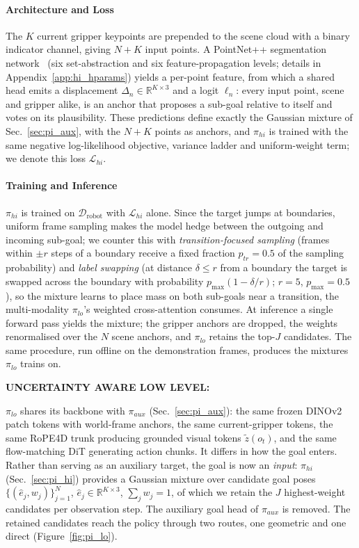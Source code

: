\documentclass[letterpaper, 10 pt, conference]{ieeeconf}  %
\begin{document}
\paragraph{\textbf{Architecture and Loss}}
The $K$ current gripper keypoints are prepended to the scene cloud with a
binary indicator channel, giving $N{+}K$ input points. A PointNet++
segmentation network~\cite{pointnet++} (six set-abstraction and six
feature-propagation levels; details in Appendix~\ref{app:hi_hparams}) yields a
per-point feature, from which a shared head emits a displacement
$\Delta_n\in\mathbb{R}^{K\times 3}$ and a logit $\ell_n$: every input point,
scene and gripper alike, is an anchor that proposes a sub-goal relative to
itself and votes on its plausibility. These predictions define exactly the
Gaussian mixture of Sec.~\ref{sec:pi_aux}, with the $N{+}K$ points as anchors,
and $\pi_{hi}$ is trained with the same
negative log-likelihood objective, variance ladder and uniform-weight term;
we denote this loss $\mathcal{L}_{hi}$.

\paragraph{\textbf{Training and Inference}}
$\pi_{hi}$ is trained on $\mathcal{D}_{\text{robot}}$ with $\mathcal{L}_{hi}$
alone. Since the target jumps at boundaries, uniform frame sampling makes the
model hedge between the outgoing and incoming sub-goal; we counter this with
\emph{transition-focused sampling} (frames within $\pm r$ steps of a boundary
receive a fixed fraction $p_{tr}{=}0.5$ of the sampling probability) and
\emph{label swapping} (at distance $\delta\le r$ from a boundary the target is swapped across the
boundary with probability $p_{\max}(1-\delta/r)$; $r{=}5$, $p_{\max}{=}0.5$), so the
mixture learns to place mass on both sub-goals near a transition, the
multi-modality $\pi_{lo}$'s weighted cross-attention consumes. At inference a
single forward pass yields the mixture; the gripper anchors are dropped, the
weights renormalised over the $N$ scene anchors, and $\pi_{lo}$ retains the
top-$J$ candidates. The same procedure, run offline on the demonstration
frames, produces the mixtures $\pi_{lo}$ trains on.


\textbf{UNCERTAINTY AWARE LOW LEVEL:}

$\pi_{lo}$ shares its backbone with $\pi_{aux}$ (Sec.~\ref{sec:pi_aux}): the same frozen
DINOv2 patch tokens with world-frame anchors, the same current-gripper tokens, the same
RoPE4D trunk producing grounded visual tokens $\tilde{z}(o_t)$, and the same flow-matching
DiT generating action chunks. It differs in how the goal enters. Rather than serving as an
auxiliary target, the goal is now an \emph{input}: $\pi_{hi}$ (Sec.~\ref{sec:pi_hi})
provides a Gaussian mixture over candidate goal poses $\{(\hat{e}_j, w_j)\}_{j=1}^{N}$,
$\hat{e}_j\in\mathbb{R}^{K\times 3}$, $\sum_j w_j=1$, of which we retain the $J$
highest-weight candidates per observation step. The auxiliary goal head of $\pi_{aux}$ is
removed. The retained candidates reach the policy through two routes, one geometric and
one direct (Figure~\ref{fig:pi_lo}).
\end{document}
